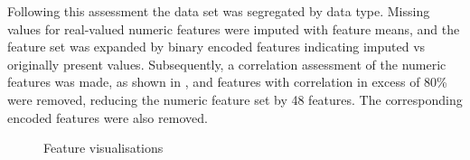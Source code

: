 \documentclass{article}
\begin{document}
Following this assessment the data set was segregated by data type.
Missing values for  real-valued numeric features were imputed with feature means, and the feature set was expanded by binary encoded features indicating imputed vs originally present values.
Subsequently, a correlation assessment of the numeric features was made, as shown in , and features with correlation in excess of 80\% were removed, reducing the numeric feature set by 48 features.
The corresponding encoded features were also removed.

\begin{figure}[htbp]
\centering

%
%

\centering
\label{fig:ROC}
\caption{Feature visualisations}
\end{figure}
\end{document}
